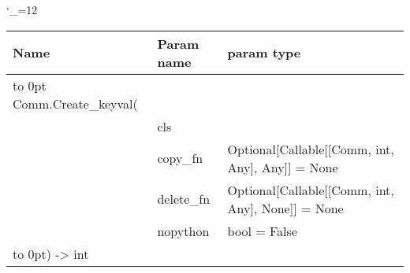\begingroup \catcode`\_=12 \tt
\begin{tabular}{lll}
\toprule
\textrm{Name}&\textrm{Param name}&\textrm{param type}\\
\midrule
\hbox to 0pt {Comm.Create_keyval(\hss}\\
& cls\\
& copy_fn & Optional[Callable[[Comm, int, Any], Any]] = None\\
& delete_fn & Optional[Callable[[Comm, int, Any], None]] = None\\
& nopython & bool = False\\
\hbox to 0pt{) -> int\hss}\\
\bottomrule
\end{tabular}
\endgroup
